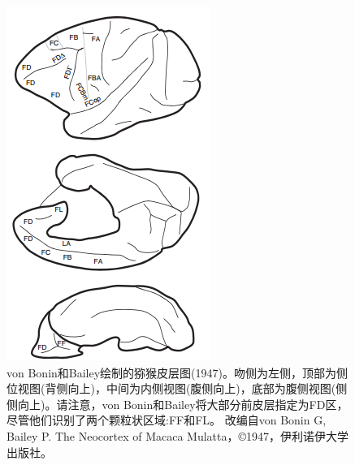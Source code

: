 \begin{figure}[!htb]
	\centering
	\includegraphics[width=0.5\linewidth]{image_pfc/Fig_1_1}
	\caption{von Bonin和Bailey绘制的猕猴皮层图(1947)。吻侧为左侧，顶部为侧位视图(背侧向上)，中间为内侧视图(腹侧向上)，底部为腹侧视图(侧侧向上)。请注意，von Bonin和Bailey将大部分前皮层指定为FD区，尽管他们识别了两个颗粒状区域:FF和FL。
		改编自von Bonin G, Bailey P. The Neocortex of Macaca Mulatta，©1947，伊利诺伊大学出版社。\label{fig:1_1}}
\end{figure}

